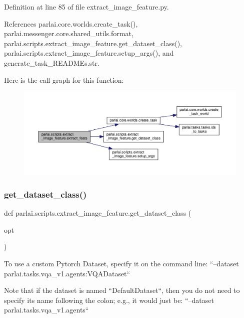 Definition at line 85 of file extract\+\_\+image\+\_\+feature.\+py.



References parlai.\+core.\+worlds.\+create\+\_\+task(), parlai.\+messenger.\+core.\+shared\+\_\+utils.\+format, parlai.\+scripts.\+extract\+\_\+image\+\_\+feature.\+get\+\_\+dataset\+\_\+class(), parlai.\+scripts.\+extract\+\_\+image\+\_\+feature.\+setup\+\_\+args(), and generate\+\_\+task\+\_\+\+R\+E\+A\+D\+M\+Es.\+str.

Here is the call graph for this function\+:
\nopagebreak
\begin{figure}[H]
\begin{center}
\leavevmode
\includegraphics[width=350pt]{namespaceparlai_1_1scripts_1_1extract__image__feature_a6e3b12d361756ec79fbd44abd185387b_cgraph}
\end{center}
\end{figure}
\mbox{\label{namespaceparlai_1_1scripts_1_1extract__image__feature_a4fa5d8aef45056034f4898531a0f9967}} 
\subsubsection{\texorpdfstring{get\+\_\+dataset\+\_\+class()}{get\_dataset\_class()}}
{\footnotesize\ttfamily def parlai.\+scripts.\+extract\+\_\+image\+\_\+feature.\+get\+\_\+dataset\+\_\+class (\begin{DoxyParamCaption}\item[{}]{opt }\end{DoxyParamCaption})}

\begin{DoxyVerb}To use a custom Pytorch Dataset, specify it on the command line:
    ``--dataset parlai.tasks.vqa_v1.agents:VQADataset``

    Note that if the dataset is named ``DefaultDataset``, then you do
    not need to specify its name following the colon; e.g., it
    would just be:
    ``--dataset parlai.tasks.vqa_v1.agents``
\end{DoxyVerb}
 

